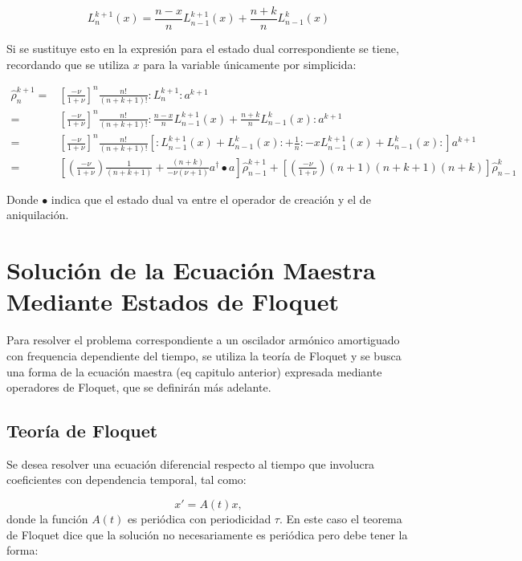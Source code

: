 \documentclass[a4paper,10pt]{report}
\begin{document}
\begin{equation}
L_n^{k+1}(x) = \frac{n-x}{n}L_{n-1}^{k+1}(x) + \frac{n+k}{n}L_{n-1}^{k}(x)
\end{equation}

Si se sustituye esto en la expresión para el estado dual correspondiente se tiene, recordando que se utiliza $x$ para la variable únicamente por simplicida:

\begin{align}
\hat{\rho}_n ^{k+1} =& [\frac{-\nu}{1+\nu}]^n \frac{n!}{(n+k+1)!} :L_n^{k+1}:a^{k+1}\\
=&[\frac{-\nu}{1+\nu}]^n\frac{n!}{(n+k+1)!} :\frac{n-x}{n}L_{n-1}^{k+1}(x) + \frac{n+k}{n}L_{n-1}^{k}(x):a^{k+1}\\
=&[\frac{-\nu}{1+\nu}]^n\frac{n!}{(n+k+1)!}[:L_{n-1}^{k+1}(x)+L_{n-1}^{k}(x):+\frac{1}{n}:-xL_{n-1}^{k+1}(x)+L_{n-1}^{k}(x):]a^{k+1}\\
=&[(\frac{-\nu}{1+\nu})\frac{1}{(n+k+1)}+ \frac{(n+k)}{-\nu(\nu+1)}a^\dagger \bullet a]\hat{\rho}_{n-1} ^{k+1} + [(\frac{-\nu}{1+\nu}) (n+1)(n+k+1)(n+k)]\hat{\rho}_{n-1} ^{k}
\end{align}

Donde $\bullet$ indica que el estado dual va entre el operador de creación y el de aniquilación.


\chapter{Solución de la Ecuación Maestra Mediante Estados de Floquet}

Para resolver el problema correspondiente a un oscilador armónico amortiguado con frequencia dependiente del tiempo, se utiliza la teoría de Floquet \cite{WardFT}y se busca una forma de la ecuación maestra (eq capitulo anterior) expresada mediante operadores de Floquet, que se definirán más adelante.

\section{Teoría de Floquet}

Se desea resolver una ecuación diferencial respecto al tiempo que involucra coeficientes con dependencia temporal, tal como:

\begin{equation}\label{FloquetEquation}
x' = A(t)x,
\end{equation} donde la función $A(t)$ es periódica con periodicidad $\tau$. En este caso el teorema de Floquet\cite{WardFT} dice que la solución no necesariamente es periódica pero debe tener la forma:
\end{document}
